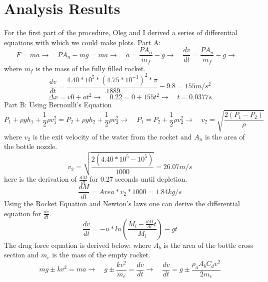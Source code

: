 \documentclass[a4paper,11pt]{article}
\begin{document}
\section{Analysis Results}
{}
{\quad For the first part of the procedure, Oleg and I derived a series of differential equations with which we could make plots.}
{Part A: }
\begin{equation} 
    F = ma  \rightarrow \quad PA_{n} - mg = ma \rightarrow \quad a = \frac{PA_{n}}{m_{f}}-g \rightarrow \quad \frac{dv}{dt} = \frac{PA_{n}}{m_{f}}-g \rightarrow \quad 
\end{equation}
{where $m_{f}$ is the mass of the fully filled rocket.}
\begin{equation}   
    \frac{dv}{dt} = \frac{4.40*10^5*(4.75*10^{-3})^{2}*\pi}{.1889}-9.8 = 155 m/s^2
\end{equation}
\begin{equation}   
    \Delta x = v0 + at^2 \rightarrow \quad 0.22 = 0 + 155t^2 \rightarrow \quad t = 0.0377s
\end{equation}
{Part B: Using Bernoulli's Equation}
\begin{equation} 
    P_{1} + \rho gh_{1} + \frac{1}{2}\rho v_{1}^2 = P_{2} + \rho gh_{2} + \frac{1}{2}\rho v_{2}^2\rightarrow\quad  P_{1} = P_{2} + \frac{1}{2}\rho v_{2}^2\rightarrow \quad v_{2} = \sqrt{\frac{2(P_{1} - P_{2})}{\rho}}  
\end{equation}
{where $v_{2}$ is the exit velocity of the water from the rocket and $A_{n}$ is the area of the bottle nozzle.}
\begin{equation}
    v_{2} = \sqrt{\frac{2(4.40*10^5- 10^5)}{1000}} = 26.07m/s
\end{equation}
{here is the derivation of $\frac{dM}{dt}$ for 0.27 seconds until depletion.}
\begin{equation}
    \frac{dM}{dt} = Area * v_{2} * 1000 = 1.84 kg/s  
\end{equation}
{Using the Rocket Equation and Newton's laws one can derive the differential equation for $\frac{dv}{dt}$.}
\begin{equation}
    \frac{dv}{dt} = -u*ln(\frac{M_{i}-\frac{dM}{dt}t}{M_{i}}) - gt
\end{equation}
{The drag force equation is derived below: where $A_{b}$ is the area of the bottle cross section and $m_{e}$ is the mass of the empty rocket.}
\begin{equation}
    mg \pm kv^2 = ma \rightarrow \quad g \pm \frac{kv^2}{m_{e}} = \frac{dv}{dt} \rightarrow \quad 
    \frac{dv}{dt} = g \pm \frac{\rho_{a} A_{b}C_{d}v^2}{2m_{e}}
\end{equation}
\end{document}
